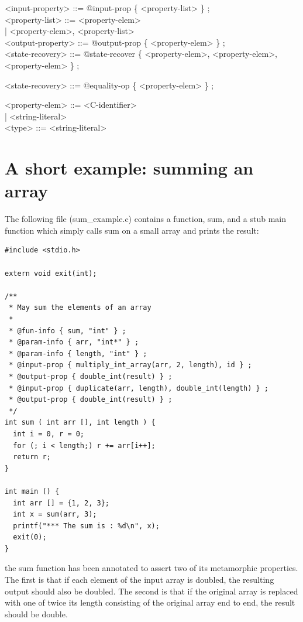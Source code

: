 \documentclass[notitlepage]{article}
\begin{document}
<input-property> ::= @input-prop \{ <property-list> \} ; \\

<property-list> ::= <property-elem> \\
\phantom{1}\hspace{85pt}| <property-elem>, <property-list> \\

<output-property> ::= @output-prop \{ <property-elem> \} ; \\

<state-recovery> ::= @state-recover \{ <property-elem>, <property-elem>, <property-elem> \} ;

<state-recovery> ::= @equality-op \{ <property-elem> \} ;

<property-elem> ::= <C-identifier> \\
\phantom{1}\hspace{85pt}| <string-literal> \\

<type> ::= <string-literal>


\rmfamily

\section{A short example: summing an array}

The following file (sum\_example.c) contains a function, sum, and a stub main function which simply calls sum on a small array and prints the result:

\begin{verbatim}
#include <stdio.h>

extern void exit(int);

/**
 * May sum the elements of an array
 *
 * @fun-info { sum, "int" } ;
 * @param-info { arr, "int*" } ;
 * @param-info { length, "int" } ;
 * @input-prop { multiply_int_array(arr, 2, length), id } ;
 * @output-prop { double_int(result) } ;
 * @input-prop { duplicate(arr, length), double_int(length) } ;
 * @output-prop { double_int(result) } ;
 */
int sum ( int arr [], int length ) {
  int i = 0, r = 0;
  for (; i < length;) r += arr[i++];
  return r;
}

int main () {
  int arr [] = {1, 2, 3};
  int x = sum(arr, 3);
  printf("*** The sum is : %d\n", x);
  exit(0);
}
\end{verbatim}

the sum function has been annotated to assert two of its metamorphic properties. The first is that if each element of the input array is doubled, the resulting output should also be doubled. The second is that if the original array is replaced with one of twice its length consisting of the original array end to end, the result should be double.
\end{document}
